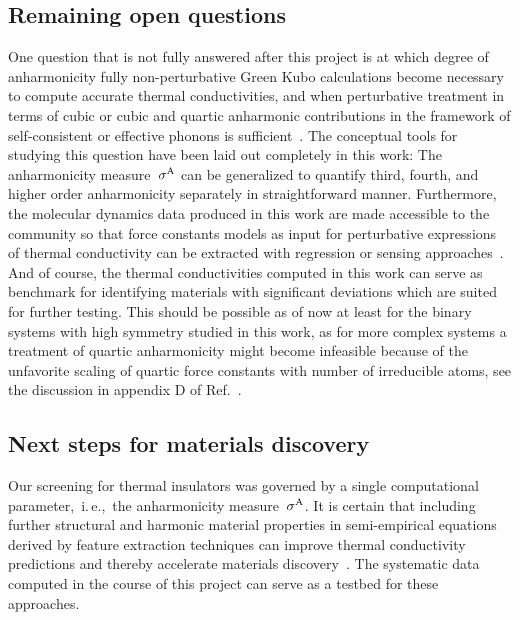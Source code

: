 \subsection*{Remaining open questions}
\label{sec:outlook.open_questions}
One question that is not fully answered after this project is at which degree of anharmonicity fully non-perturbative Green Kubo calculations become necessary to compute accurate thermal conductivities, and when perturbative treatment in terms of cubic or cubic and quartic anharmonic contributions in the framework of self-consistent or effective phonons is sufficient~\cite{Hellman.2013b,Feng.2016,Tadano.2018zm7,Xia.2018,Ravichandran.2018}. The conceptual tools for studying this question have been laid out completely in this work: The anharmonicity measure~$\sigma^\mathrm{A}$ can be generalized to quantify third, fourth, and higher order anharmonicity separately in straightforward manner. Furthermore, the molecular dynamics data produced in this work are made accessible to the community so that force constants models as input for perturbative expressions of thermal conductivity can be extracted with regression or sensing approaches~\cite{Zhou.2014,Fransson.2020}. And of course, the thermal conductivities computed in this work can serve as benchmark for identifying materials with significant deviations which are suited for further testing. This should be possible as of now at least for the binary systems with high symmetry studied in this work, as for more complex systems a treatment of quartic anharmonicity might become infeasible because of the unfavorite scaling of quartic force constants with number of irreducible atoms, see the discussion in appendix D of Ref.~\cite{Ravichandran.2018}.

\subsection*{Next steps for materials discovery}
Our screening for thermal insulators was governed by a single computational parameter,~i.\,e.,~the anharmonicity measure~$\sigma^\mathrm{A}$. It is certain that including further structural and harmonic material properties in semi-empirical equations derived by feature extraction techniques can improve thermal conductivity predictions and thereby accelerate materials discovery~\cite{Ouyang.2018,Goldsmith.2017,Chen.2019,Purcell2021}. The systematic data computed in the course of this project can serve as a testbed for these approaches.

